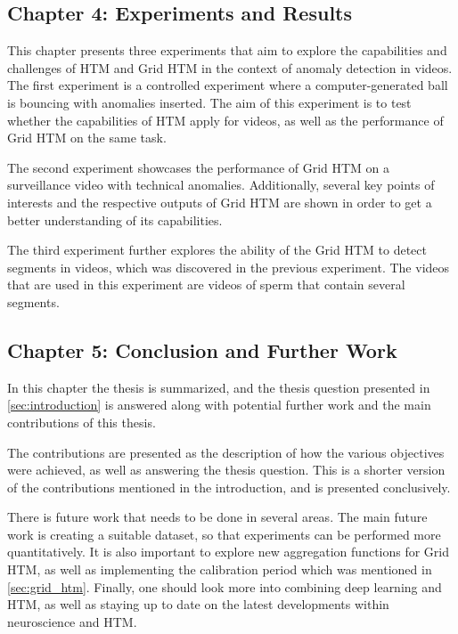 \subsection*{Chapter 4: Experiments and Results}
This chapter presents three experiments that aim to explore the capabilities and challenges of HTM and Grid HTM in the context of anomaly detection in videos. The first experiment is a controlled experiment where a computer-generated ball is bouncing with anomalies inserted. The aim of this experiment is to test whether the capabilities of HTM apply for videos, as well as the performance of Grid HTM on the same task.
\par
The second experiment showcases the performance of Grid HTM on a surveillance video with technical anomalies. Additionally, several key points of interests and the respective outputs of Grid HTM are shown in order to get a better understanding of its capabilities.
\par
The third experiment further explores the ability of the Grid HTM to detect segments in videos, which was discovered in the previous experiment. The videos that are used in this experiment are videos of sperm that contain several segments.
\subsection*{Chapter 5: Conclusion and Further Work}
In this chapter the thesis is summarized, and the thesis question presented in \autoref{sec:introduction} is answered along with potential further work and the main contributions of this thesis.
\par
The contributions are presented as the description of how the various objectives were achieved, as well as answering the thesis question. This is a shorter version of the contributions mentioned in the introduction, and is presented conclusively.
\par
There is future work that needs to be done in several areas. The main future work is creating a suitable dataset, so that experiments can be performed more quantitatively. It is also important to explore new aggregation functions for Grid HTM, as well as implementing the calibration period which was mentioned in \autoref{sec:grid_htm}. Finally, one should look more into combining deep learning and HTM, as well as staying up to date on the latest developments within neuroscience and HTM.